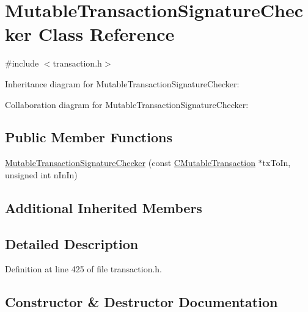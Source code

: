 \hypertarget{class_mutable_transaction_signature_checker}{}\section{Mutable\+Transaction\+Signature\+Checker Class Reference}
\label{class_mutable_transaction_signature_checker}


{\ttfamily \#include $<$transaction.\+h$>$}



Inheritance diagram for Mutable\+Transaction\+Signature\+Checker\+:


Collaboration diagram for Mutable\+Transaction\+Signature\+Checker\+:
\subsection*{Public Member Functions}
\begin{DoxyCompactItemize}
\item 
\hyperlink{class_mutable_transaction_signature_checker_ac46799549e6eeebaff38cb1c9f5e1663}{Mutable\+Transaction\+Signature\+Checker} (const \hyperlink{struct_c_mutable_transaction}{C\+Mutable\+Transaction} $\ast$tx\+To\+In, unsigned int n\+In\+In)
\end{DoxyCompactItemize}
\subsection*{Additional Inherited Members}


\subsection{Detailed Description}


Definition at line 425 of file transaction.\+h.



\subsection{Constructor \& Destructor Documentation}
\hypertarget{class_mutable_transaction_signature_checker_ac46799549e6eeebaff38cb1c9f5e1663}{}
